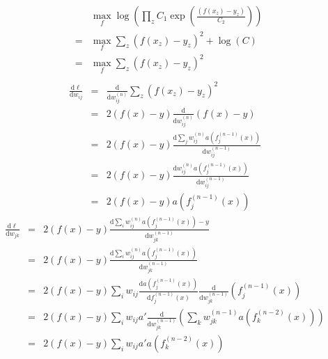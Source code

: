 \documentclass{article}
\newcommand{\mathd}{\mathrm{d}}
\newcommand{\nocomma}{}
\begin{document}
\begin{eqnarray*}
  &  & \max_f \log \left( \prod_z C_1 \exp \left( \frac{( f ( x_z) -
  y_z)}{C_2} \right) \right)\\
  & = & \max_f  \sum_z  ( f ( x_z) - y_z)^2 + \log ( C)\\
  & = & \max_f  \sum_z  ( f ( x_z) - y_z)^2
\end{eqnarray*}
\begin{eqnarray*}
  &  & 
\end{eqnarray*}
\begin{eqnarray*}
  \frac{\mathd \ell}{\mathd w_{i \nocomma j}}  & = & \frac{\mathd}{\mathd w_{i
  \nocomma j}^{( n)}}  \sum_z  ( f ( x_z) - y_z)^2\\
  & = & 2 ( f ( x) - y)  \frac{\mathd}{\mathd w_{i \nocomma \nocomma j}^{(
  n)}}  ( f^{} ( x) - y)\\
  & = & 2 ( f ( x) - y)  \frac{\mathd \sum_j w_{i \nocomma j}^{( n)} a (
  f_j^{( n - 1)} ( x))}{\mathd w_{i \nocomma j}^{( n - 1)}}\\
  & = & 2 ( f ( x) - y)  \frac{\mathd w_{i \nocomma j}^{( n)} a ( f_j^{( n -
  1)} ( x))}{\mathd w_{i \nocomma j}^{( n - 1)}}\\
  & = & 2 ( f ( x) - y) a ( f_j^{( n - 1)} ( x))
\end{eqnarray*}
\begin{eqnarray*}
  \frac{\mathd \ell}{\mathd w_{j \nocomma k}}  & = & 2 ( f ( x) - y) 
  \frac{\mathd \sum_i w_{i \nocomma j}^{( n)} a ( f_j^{( n - 1)} ( x)) -
  y}{\mathd w_{j \nocomma k}^{( n - 1)}}\\
  & = & 2 ( f ( x) - y)  \frac{\mathd \sum_i w_{i \nocomma j}^{( n)} a (
  f_j^{( n - 1)} ( x))}{\mathd w_{j \nocomma k}^{( n - 1)}}\\
  & = & 2 ( f ( x) - y)  \sum_i w_{i \nocomma j}  \frac{\mathd a ( f_j^{( n -
  1)} ( x))}{\mathd f_j^{( n - 1)} ( x)}  \frac{\mathd}{\mathd w_{j \nocomma
  k}^{( n - 1)}}  ( f_j^{( n - 1)} ( x))\\
  & = & 2 ( f ( x) - y)  \sum_i w_{i \nocomma j} a'  \frac{\mathd}{\mathd
  w_{j \nocomma k}^{( n - 1)}}  \left( \sum_k w_{j \nocomma k}^{( n - 1)} a (
  f_k^{( n - 2)}  ( x)) \right)\\
  & = & 2 ( f ( x) - y)  \sum_i w_{i \nocomma j} a' a ( f_k^{( n - 2)}  ( x))
\end{eqnarray*}
\end{document}
